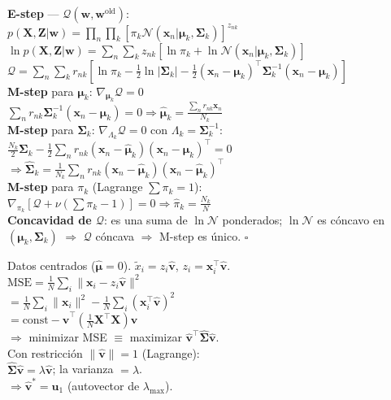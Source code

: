 \documentclass[10pt, a4paper]{article}
\newcommand{\w}{\mathbf{w}}
\newcommand{\x}{\mathbf{x}}
\newcommand{\X}{\mathbf{X}}
\newcommand{\muu}{\boldsymbol{\mu}}
\newcommand{\Sig}{\boldsymbol{\Sigma}}
\begin{document}
\begin{minipage}[t]{0.3299\textwidth}
\begin{tcolorbox}[formulabox={Demo: EM-GMM - $Q$ y concavidad}, colframe=softBrown]
    \textbf{E-step} — $\mathcal{Q}(\w,\w^\text{old})$:\\
    $p(\X,\mathbf{Z}|\w)=\prod_n\prod_k[\pi_k\mathcal{N}(\x_n|\muu_k,\Sig_k)]^{z_{nk}}$\\
    $\ln p(\X,\mathbf{Z}|\w)=\sum_n\sum_k z_{nk}[\ln\pi_k+\ln\mathcal{N}(\x_n|\muu_k,\Sig_k)]$\\
    $\mathcal{Q}=\sum_n\sum_k r_{nk}[\ln\pi_k - \tfrac{1}{2}\ln|\Sig_k| - \tfrac{1}{2}(\x_n{-}\muu_k)^\top\Sig_k^{-1}(\x_n{-}\muu_k)]$\\[2pt]
    \textbf{M-step} para $\muu_k$: $\nabla_{\muu_k}\mathcal{Q}=0$\\
    $\sum_n r_{nk}\Sig_k^{-1}(\x_n{-}\muu_k)=0 \Rightarrow \hat{\muu}_k = \tfrac{\sum_n r_{nk}\x_n}{N_k}$\\[2pt]
    \textbf{M-step} para $\Sig_k$: $\nabla_{\Lambda_k}\mathcal{Q}=0$ con $\Lambda_k=\Sig_k^{-1}$:\\
    $\tfrac{N_k}{2}\Sig_k - \tfrac{1}{2}\sum_n r_{nk}(\x_n{-}\hat{\muu}_k)(\x_n{-}\hat{\muu}_k)^\top=0$\\
    $\Rightarrow \hat{\Sig}_k = \tfrac{1}{N_k}\sum_n r_{nk}(\x_n{-}\hat{\muu}_k)(\x_n{-}\hat{\muu}_k)^\top$\\[2pt]
    \textbf{M-step} para $\pi_k$ (Lagrange $\sum\pi_k=1$):\\
    $\nabla_{\pi_k}[\mathcal{Q}+\nu(\sum\pi_k-1)]=0 \Rightarrow \hat{\pi}_k=\tfrac{N_k}{N}$\\[2pt]
    \textbf{Concavidad de $\mathcal{Q}$}: es una suma de $\ln\mathcal{N}$ ponderados; $\ln\mathcal{N}$ es cóncavo en $(\muu_k,\Sig_k)$ $\Rightarrow$ $\mathcal{Q}$ cóncava $\Rightarrow$ M-step es único. $\square$
\end{tcolorbox}

\begin{tcolorbox}[formulabox={Demo: PCA minimiza error de recon.}, colframe=softBrown]
    Datos centrados ($\hat{\muu}=0$). $\tilde{x}_i = z_i\hat{\mathbf{v}}$, $z_i = \x_i^\top\hat{\mathbf{v}}$.\\
    $\text{MSE} = \tfrac{1}{N}\sum_i\|\x_i - z_i\hat{\mathbf{v}}\|^2$\\
    $= \tfrac{1}{N}\sum_i\|\x_i\|^2 - \tfrac{1}{N}\sum_i(\x_i^\top\hat{\mathbf{v}})^2$\\
    $= \text{const} - \hat{\mathbf{v}}^\top\!\left(\tfrac{1}{N}\X^\top\X\right)\!\hat{\mathbf{v}}$\\
    $\Rightarrow$ minimizar MSE $\equiv$ maximizar $\hat{\mathbf{v}}^\top\hat{\Sig}\hat{\mathbf{v}}$.\\
    Con restricción $\|\hat{\mathbf{v}}\|=1$ (Lagrange):\\
    $\hat{\Sig}\hat{\mathbf{v}}=\lambda\hat{\mathbf{v}}$; la varianza $=\lambda$.\\
    $\Rightarrow \hat{\mathbf{v}}^*=\mathbf{u}_1$ (autovector de $\lambda_{\max}$).
\end{tcolorbox}


\end{minipage}
\end{document}
